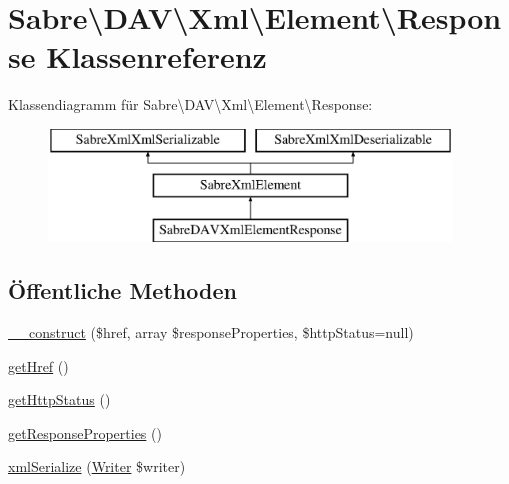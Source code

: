 \hypertarget{class_sabre_1_1_d_a_v_1_1_xml_1_1_element_1_1_response}{}\section{Sabre\textbackslash{}D\+AV\textbackslash{}Xml\textbackslash{}Element\textbackslash{}Response Klassenreferenz}
\label{class_sabre_1_1_d_a_v_1_1_xml_1_1_element_1_1_response}
Klassendiagramm für Sabre\textbackslash{}D\+AV\textbackslash{}Xml\textbackslash{}Element\textbackslash{}Response\+:\begin{figure}[H]
\begin{center}
\leavevmode
\includegraphics[height=3.000000cm]{class_sabre_1_1_d_a_v_1_1_xml_1_1_element_1_1_response}
\end{center}
\end{figure}
\subsection*{Öffentliche Methoden}
\begin{DoxyCompactItemize}
\item 
\mbox{\hyperlink{class_sabre_1_1_d_a_v_1_1_xml_1_1_element_1_1_response_a91719a3bad1ce1121c37de2c8e60de74}{\+\_\+\+\_\+construct}} (\$href, array \$response\+Properties, \$http\+Status=null)
\item 
\mbox{\hyperlink{class_sabre_1_1_d_a_v_1_1_xml_1_1_element_1_1_response_a0b8048767425c6353d47df529af04e84}{get\+Href}} ()
\item 
\mbox{\hyperlink{class_sabre_1_1_d_a_v_1_1_xml_1_1_element_1_1_response_a44f386327f094c1b830eacecb3fbc907}{get\+Http\+Status}} ()
\item 
\mbox{\hyperlink{class_sabre_1_1_d_a_v_1_1_xml_1_1_element_1_1_response_aa519d0f7baebc4438f88c2415bdbcf40}{get\+Response\+Properties}} ()
\item 
\mbox{\hyperlink{class_sabre_1_1_d_a_v_1_1_xml_1_1_element_1_1_response_ab0849b6aace12b8039ca08461af88f69}{xml\+Serialize}} (\mbox{\hyperlink{class_sabre_1_1_xml_1_1_writer}{Writer}} \$writer)
\end{DoxyCompactItemize}

